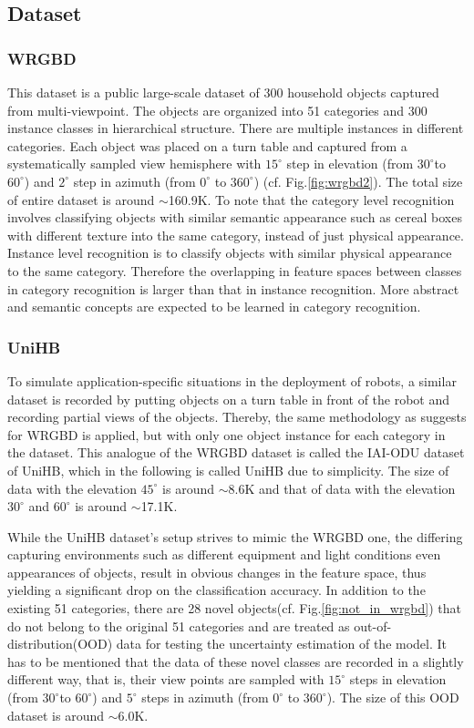 \subsection{Dataset}
\subsubsection{WRGBD\cite{lai2011large}}
This dataset is a public large-scale dataset of 300 household objects captured from multi-viewpoint.
The objects are organized into 51 categories and 300 instance classes in hierarchical structure.
There are multiple instances in different categories.
Each object was placed on a turn table and captured from a systematically sampled view hemisphere with $15^{\circ}$ step in elevation (from $30^{\circ}$to $60^{\circ}$) and $2^\circ$ step in azimuth (from $0^\circ$ to $360^\circ$) (cf. Fig.\ref{fig:wrgbd2}).
The total size of entire dataset is around $\sim$160.9K.
To note that the category level recognition involves classifying objects with similar semantic appearance such as cereal boxes with different texture into the same category, instead of just physical appearance. Instance level recognition is to classify objects with similar physical appearance to the same category.
Therefore the overlapping in feature spaces between classes in category recognition is larger than that in instance recognition.
More abstract and semantic concepts are expected to be learned in category recognition.  

\subsubsection{UniHB}
To simulate application-specific situations in the deployment of robots, a similar dataset is recorded by putting objects on a turn table in front of the robot and recording partial views of the objects.
Thereby, the same methodology as \cite{lai2011large} suggests for WRGBD is applied, but with only one object instance for each category in the dataset.
This analogue of the WRGBD dataset is called the IAI-ODU dataset of UniHB, which in the following is called UniHB due to simplicity.
The size of data with the elevation $45^\circ$ is around $\sim$8.6K and that of data with the elevation $30^\circ$ and $60^\circ$ is around $\sim$17.1K.

While the UniHB dataset's setup strives to mimic the WRGBD one, the differing capturing environments such as different equipment and light conditions even appearances of objects, result in obvious changes in the feature space, thus yielding a significant drop on the classification accuracy.
In addition to the existing 51 categories, there are 28 novel objects(cf. Fig.\ref{fig:not_in_wrgbd}) that do not belong to the original 51 categories and are treated as out-of-distribution(OOD) data for testing the uncertainty estimation of the model.
It has to be mentioned that the data of these novel classes are recorded in a slightly different way, that is, their view points are sampled with $15^{\circ}$ steps in elevation (from $30^{\circ}$to $60^{\circ}$) and $5^\circ$ steps in azimuth (from $0^\circ$ to $360^\circ$).
The size of this OOD dataset is around $\sim$6.0K.

